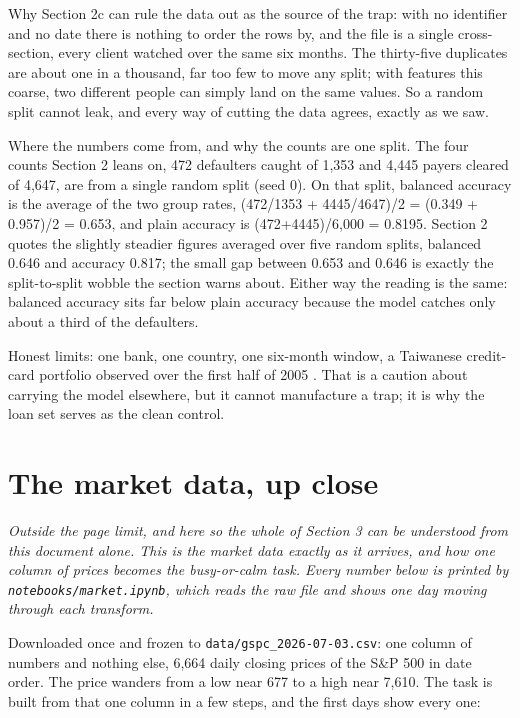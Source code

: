 \documentclass[11pt]{article} %
\begin{document}
Why Section 2c can rule the data out as the source of the trap: with no identifier and no date there is nothing to order the rows by, and the file is a single cross-section, every client watched over the same six months. The thirty-five duplicates are about one in a thousand, far too few to move any split; with features this coarse, two different people can simply land on the same values. So a random split cannot leak, and every way of cutting the data agrees, exactly as we saw.

Where the numbers come from, and why the counts are one split. The four counts Section 2 leans on, 472 defaulters caught of 1,353 and 4,445 payers cleared of 4,647, are from a single random split (seed 0). On that split, balanced accuracy is the average of the two group rates, (472/1353 + 4445/4647)/2 = (0.349 + 0.957)/2 = 0.653, and plain accuracy is (472+4445)/6,000 = 0.8195. Section 2 quotes the slightly steadier figures averaged over five random splits, balanced 0.646 and accuracy 0.817; the small gap between 0.653 and 0.646 is exactly the split-to-split wobble the section warns about. Either way the reading is the same: balanced accuracy sits far below plain accuracy because the model catches only about a third of the defaulters.

Honest limits: one bank, one country, one six-month window, a Taiwanese credit-card portfolio observed over the first half of 2005 \cite{yeh:2009}. That is a caution about carrying the model elsewhere, but it cannot manufacture a trap; it is why the loan set serves as the clean control.



\section{The market data, up close}


\emph{Outside the page limit, and here so the whole of Section 3 can be understood from this document alone. This is the market data exactly as it arrives, and how one column of prices becomes the busy-or-calm task. Every number below is printed by \texttt{notebooks/market.ipynb}, which reads the raw file and shows one day moving through each transform.}

Downloaded once and frozen to \texttt{data/gspc\_2026-07-03.csv}: one column of numbers and nothing else, 6,664 daily closing prices of the S\&P 500 in date order. The price wanders from a low near 677 to a high near 7,610. The task is built from that one column in a few steps, and the first days show every one:
\end{document}
